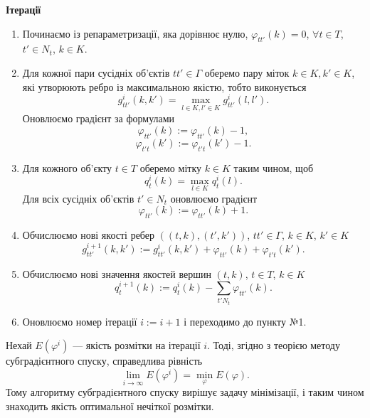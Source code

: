 \textbf{Ітерації}
\begin{enumerate}
    \item Починаємо із репараметризації, яка дорівнює нулю, $\varphi_{tt'}(k)=0$, $\forall t\in T$, $t'\in N_t$, $k\in K$.
    \item Для кожної пари сусідніх об'єктів $tt'\in\Gamma$ оберемо пару міток $k\in K, k'\in K$, які утворюють ребро
    із максимальною якістю, тобто виконується 
    \begin{equation*}
        g^i_{tt'}(k,k') = \max\limits_{l\in K, l'\in K}g^i_{tt'}(l,l').
    \end{equation*}
    Оновлюємо градієнт за формулами
    \begin{equation*}
        \varphi_{tt'}(k):=\varphi_{tt'}(k)-1,
    \end{equation*}
    \begin{equation*}
        \varphi_{t't}(k'):=\varphi_{t't}(k')-1.
    \end{equation*}
    \item Для кожного об'єкту $t\in T$ оберемо мітку $k\in K$ таким чином, щоб
    \begin{equation*}
        q^i_t(k) = \max_{l\in K} q^i_t(l).
    \end{equation*}
    Для всіх сусідніх об'єктів $t'\in N_t$ оновлюємо градієнт
    \begin{equation*}
        \varphi_{tt'}(k):=\varphi_{tt'}(k)+1.
    \end{equation*}
    \item  Обчислюємо нові якості ребер $((t,k),(t',k'))$, $tt'\in\Gamma$, $k\in K$, $k'\in K$
    \begin{equation*}
        g^{i+1}_{tt'}(k,k') := g^i_{tt'}(k,k') + \varphi_{tt'}(k) + \varphi_{t't}(k').
    \end{equation*}
    \item Обчислюємо нові значення якостей вершин $(t,k)$, $t\in T$, $k\in K$
    \begin{equation*}
        q^{i+1}_t(k) :=  q^{i}_t(k) - \sum\limits_{t'N_t}\varphi_{tt'}(k).
    \end{equation*}
    \item Оновлюємо номер ітерації $i:=i+1$ і переходимо до пункту №1.
\end{enumerate}

Нехай $E(\varphi^i)$ --- якість розмітки на ітерації $i$. Тоді, згідно з теорією
методу субградієнтного спуску, справедлива рівність \cite{Shor1985}
\begin{equation*}
    \lim_{i\rightarrow\infty}E(\varphi^i) = \min_{\varphi}E(\varphi).
\end{equation*}
Тому алгоритму субградієнтного спуску вирішує задачу мінімізації, і таким чином
знаходить якість оптимальної нечіткої розмітки.

